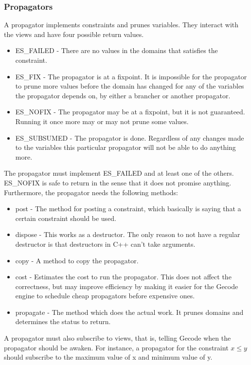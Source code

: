 \documentclass[a4paper,11pt]{article}
\begin{document}
\subsubsection{Propagators}
A propagator implements constraints and prunes variables. They interact with the views and have four possible return values.
\begin{itemize}
\item{ES\_FAILED} - There are no values in the domains that satisfies the constraint. 
\item{ES\_FIX} - The propagator is at a fixpoint. It is impossible for the propagator to prune more values before the domain has changed for any of the variables the propagator depends on, by either a brancher or another propagator.
\item{ES\_NOFIX} - The propagator may be at a fixpoint, but it is not guaranteed. Running it once more may or may not prune some values. 
\item{ES\_SUBSUMED} - The propagator is done. Regardless of any changes made to the variables this particular propagator will not be able to do anything more.
\end{itemize}
The propagator must implement ES\_FAILED and at least one of the others. ES\_NOFIX is safe to return in the sense that it does not promise anything. Furthermore, the propagator needs the following methods:
\begin{itemize}
\item{post} - The method for posting a constraint, which basically is saying that a certain constraint should be used.
\item{dispose} - This works as a destructor. The only reason to not have a regular destructor is that destructors in C++ can't take arguments.
\item{copy} - A method to copy the propagator.
\item{cost} - Estimates the cost to run the propagator. This does not affect the correctness, but may improve efficiency by making it easier for the Gecode engine to schedule cheap propagators before expensive ones.
\item{propagate} - The method which does the actual work. It prunes domains and determines the status to return.
\end{itemize}
A propagator must also subscribe to views, that is, telling Gecode when the propagator should be awaken. For instance, a propagator for the constraint $x\le y$ should subscribe to the maximum value of x and minimum value of y.
\end{document}
